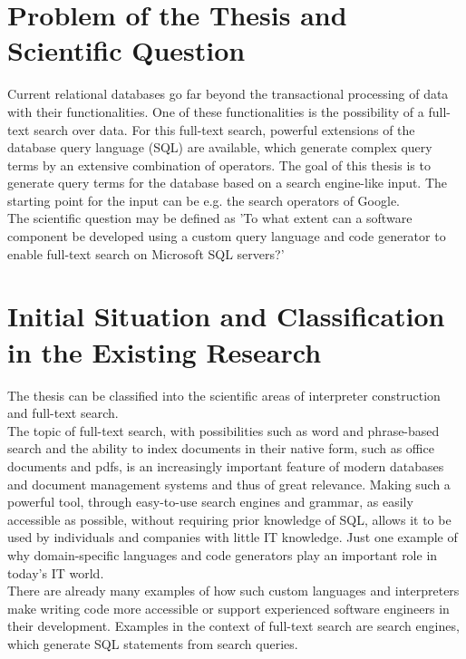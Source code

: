 \section{Problem of the Thesis and Scientific Question}
Current relational databases go far beyond the transactional processing of data with their functionalities. One of these functionalities is the possibility of a full-text search over data. For this full-text search, powerful extensions of the database query language (SQL) are available, which generate complex query terms by an extensive combination of operators. The goal of this thesis is to generate query terms for the database based on a search engine-like input. The starting point for the input can be e.g. the search operators of Google.\\
The scientific question may be defined as 'To what extent can a software component be developed using a custom query language and code generator to enable full-text search on Microsoft SQL servers?'
\newpage
\section{Initial Situation and Classification in the Existing Research}
The thesis can be classified into the scientific areas of interpreter construction and full-text search.\\
The topic of full-text search, with possibilities such as word and phrase-based search and the ability to index documents in their native form, such as office documents and pdfs, is an increasingly important feature of modern databases and document management systems and thus of great relevance. Making such a powerful tool, through easy-to-use search engines and grammar, as easily accessible as possible, without requiring prior knowledge of SQL, allows it to be used by individuals and companies with little IT knowledge. Just one example of why domain-specific languages and code generators play an important role in today's IT world.\\
There are already many examples of how such custom languages and interpreters make writing code more accessible or support experienced software engineers in their development. Examples in the context of full-text search are search engines, which generate SQL statements from search queries.
\newpage
